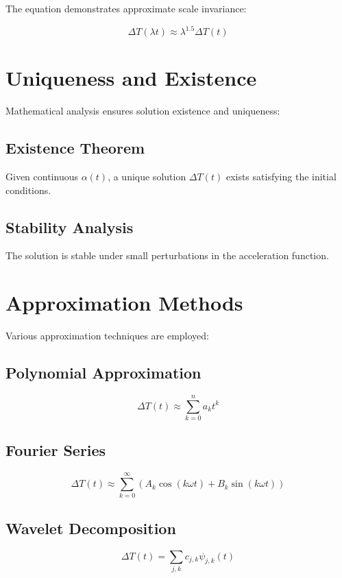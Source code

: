 \documentclass[12pt,a4paper]{report}
\begin{document}
The equation demonstrates approximate scale invariance:

\[
\Delta T(\lambda t) \approx \lambda^{1.5} \Delta T(t)
\]

\section{Uniqueness and Existence}

Mathematical analysis ensures solution existence and uniqueness:

\subsection{Existence Theorem}

Given continuous $\alpha(t)$, a unique solution $\Delta T(t)$ exists satisfying the initial conditions.

\subsection{Stability Analysis}

The solution is stable under small perturbations in the acceleration function.

\section{Approximation Methods}

Various approximation techniques are employed:

\subsection{Polynomial Approximation}

\[
\Delta T(t) \approx \sum_{k=0}^{n} a_k t^k
\]

\subsection{Fourier Series}

\[
\Delta T(t) \approx \sum_{k=0}^{\infty} \left(A_k \cos(k\omega t) + B_k \sin(k\omega t)\right)
\]

\subsection{Wavelet Decomposition}

\[
\Delta T(t) = \sum_{j,k} c_{j,k} \psi_{j,k}(t)
\]
\end{document}
